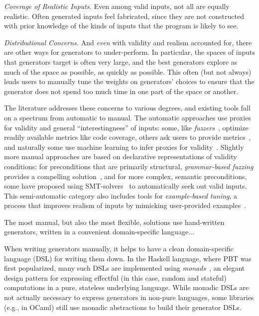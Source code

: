 {\em Coverage of Realistic Inputs.}
Even among valid inputs, not all are equally realistic. Often generated inputs
feel fabricated, since they are not constructed with prior knowledge of the
kinds of inputs that the program is likely to see.

{\em Distributional Concerns.}
And {\em even} with validity and realism accounted for, there are other ways for
generators to under-perform. In particular, the spaces of inputs that generators
target is often very large, and the best generators explore as much of the space
as possible, as quickly as possible. This often (but not always) leads users to manually tune
the weights on generators' choices to ensure that the generator does not spend
too much time in one part of the space or another.


The literature addresses these concerns to various degrees, and existing tools
fall on a spectrum from automatic to manual. The automatic approaches use
proxies for validity and general ``interestingness'' of inputs: some, like {\em
fuzzers}~\cite{afl-readme}, optimize readily available metrics like code
coverage, others ask users to provide metrics~\cite{loscher2017targetedpbt}, and
naturally some use machine learning to infer proxies for
validity~\cite{godefroid2017learn, DBLP:conf/icse/ReddyLPS20}. Slightly more
manual approaches are based on declarative representations of validity
conditions: for preconditions that are primarily structural, {\em grammar-based
fuzzing} provides a compelling solution~\cite{godefroid2008grammar,
holler2012fuzzing, veggalam2016ifuzzer, wang2019superion,
srivastava2021gramatron}, and for more complex, semantic preconditions, some
have proposed using SMT-solvers~\cite{dewey2017automated, LuckPOPL,
steinhofel2022input} to automatically seek out valid inputs. This semi-automatic
category also includes tools for {\em example-based tuning}, a process that
improves realism of inputs by mimicking user-provided
examples~\cite{soremekun2020inputs}.

The most manual, but also the most flexible, solutions use hand-written
generators, written in a convenient domain-specific language...

When writing generators manually, it helps to have a clean domain-specific
language (DSL) for writing them down. In the Haskell language, where PBT was
first popularized, many such DSLs are implemented using {\em
monads\/}~\cite{moggi1991notions}, an elegant design pattern for
expressing effectful (in this case, random and stateful) computations
in a pure, stateless underlying
language. While monadic DSLs are not actually necessary to express generators in
non-pure languages, some libraries (e.g., in OCaml) still use monadic
abstractions to build their generator DSLs.

